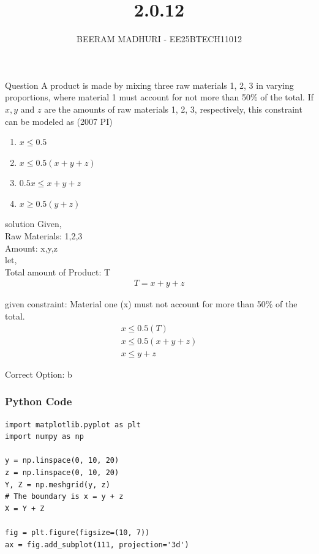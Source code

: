 \documentclass{beamer}
\title %
{2.0.12}
\author %
{BEERAM MADHURI - EE25BTECH11012}
\begin{document}
\frame{\titlepage}
\begin{frame}{Question}
A product is made by mixing three raw materials 1, 2, 3 in varying proportions, where material 1 must account for not more than 50\% of the total. If $x, y$ and $z$ are the amounts of raw materials 1, 2, 3, respectively, this constraint can be modeled as \hfill(2007 PI)

\begin{enumerate}[label=\alph*)]
    \item $x \le 0.5$
    \item $x \le 0.5(x + y + z)$
    \item $0.5x \le x + y + z$
    \item $x \ge 0.5(y + z)$
\end{enumerate}
\end{frame}

\begin{frame}{solution}
Given,\\
Raw Materials: 1,2,3\\
Amount: x,y,z\\
let,\\
Total amount of Product: T\\
\begin{align}
    T = x+y+z
\end{align}
\end{frame}
\begin{frame}
given constraint: Material one (x) must not account for more than 50\% of the total.\\
\begin{align} 
    x \le 0.5(T)\\
    x \le 0.5(x+y+z)\\
    x\le y+z
\end{align}

Correct Option: b
\end{frame}

\begin{frame}[fragile]
    \frametitle{Python Code}
    \begin{lstlisting}
import matplotlib.pyplot as plt
import numpy as np

y = np.linspace(0, 10, 20)
z = np.linspace(0, 10, 20)
Y, Z = np.meshgrid(y, z)
# The boundary is x = y + z
X = Y + Z

fig = plt.figure(figsize=(10, 7))
ax = fig.add_subplot(111, projection='3d')
\end{lstlisting}
\end{frame}
\end{document}
